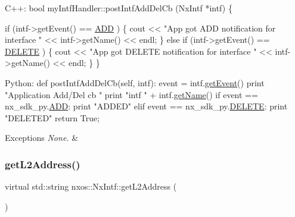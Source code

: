 \begin{DoxyCode}
C++:
    \textcolor{keywordtype}{bool} myIntfHandler::postIntfAddDelCb (NxIntf *intf)
    \{
     
    \textcolor{keywordflow}{if} (intf->getEvent() == \mbox{\hyperlink{nx__common_8h_af9a9040b7681199d386e94eb888018cba93d8c810253e44a0fd5f3d8d26032ad5}{ADD}} ) \{
       cout << \textcolor{stringliteral}{"App got ADD notification for interface  "} << 
       intf->getName() << endl;
    \} \textcolor{keywordflow}{else} \textcolor{keywordflow}{if} (intf->getEvent() == \mbox{\hyperlink{nx__common_8h_af9a9040b7681199d386e94eb888018cba7ec7c9f77651a43ea2562bb5bcb6a3a9}{DELETE}} ) \{
       cout << \textcolor{stringliteral}{"App got DELETE notification for interface "} << 
       intf->getName() << endl;
    \}
    \}  

 Python:
    def postIntfAddDelCb(\textcolor{keyword}{self}, intf):
       event = intf.\mbox{\hyperlink{classnxos_1_1_nx_intf_a148d8b41d613478294179277a03f3aeb}{getEvent}}()
       print \textcolor{stringliteral}{"Application Add/Del cb "}
       print \textcolor{stringliteral}{"intf "} + intf.\mbox{\hyperlink{classnxos_1_1_nx_intf_a8a0bff66b97d72172f8ed5ce22d8efbd}{getName}}()
       if event == nx\_sdk\_py.\mbox{\hyperlink{nx__common_8h_af9a9040b7681199d386e94eb888018cba93d8c810253e44a0fd5f3d8d26032ad5}{ADD}}:
          print \textcolor{stringliteral}{"ADDED"}
       elif event == nx\_sdk\_py.\mbox{\hyperlink{nx__common_8h_af9a9040b7681199d386e94eb888018cba7ec7c9f77651a43ea2562bb5bcb6a3a9}{DELETE}}:
          print \textcolor{stringliteral}{"DELETED"}
       return True;   
\end{DoxyCode}



\begin{DoxyExceptions}{Exceptions}
{\em None.} & \\
\hline
\end{DoxyExceptions}
\mbox{\label{classnxos_1_1_nx_intf_a8a7f92f0c28178165fd0448c33ff681b}} 
\subsubsection{\texorpdfstring{get\+L2\+Address()}{getL2Address()}}
{\footnotesize\ttfamily virtual std\+::string nxos\+::\+Nx\+Intf\+::get\+L2\+Address (\begin{DoxyParamCaption}{ }\end{DoxyParamCaption})\hspace{0.3cm}{\ttfamily [pure virtual]}}

